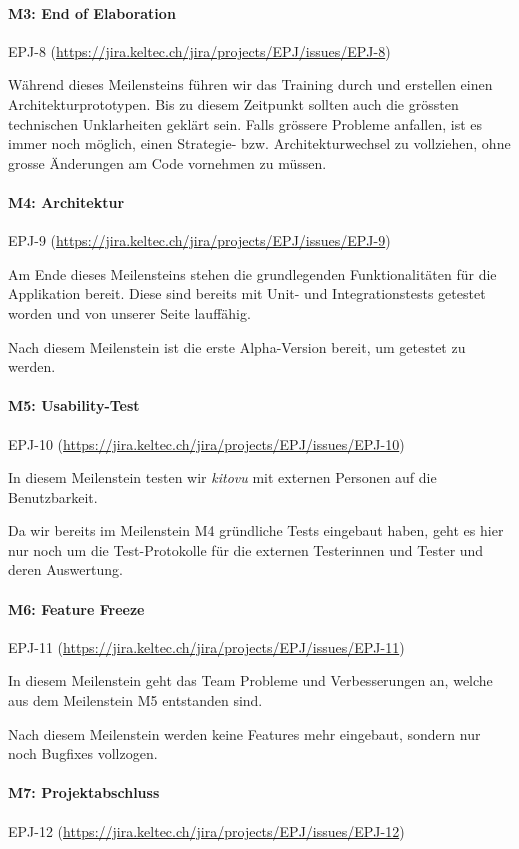 \documentclass[a4paper]{article}
\def\jiraurl{https://jira.keltec.ch/jira}
\newcommand{\fulljiraissue}[1]{EPJ-#1 (\url{\jiraurl/projects/EPJ/issues/EPJ-#1})}
\begin{document}
\paragraph{M3: End of Elaboration} \fulljiraissue{8}

Während dieses Meilensteins führen wir das Training durch und erstellen einen Architekturprototypen. Bis zu diesem Zeitpunkt sollten auch die grössten technischen Unklarheiten geklärt sein. Falls grössere Probleme anfallen, ist es immer noch möglich, einen Strategie- bzw. Architekturwechsel zu vollziehen, ohne grosse Änderungen am Code vornehmen zu müssen.

\paragraph{M4: Architektur} \fulljiraissue{9}

Am Ende dieses Meilensteins stehen die grundlegenden Funktionalitäten für die Applikation bereit. Diese sind bereits mit Unit- und Integrationstests getestet worden und von unserer Seite lauffähig.

Nach diesem Meilenstein ist die erste Alpha-Version bereit, um getestet zu werden.

\paragraph{M5: Usability-Test} \fulljiraissue{10}

In diesem Meilenstein testen wir \emph{kitovu} mit externen Personen auf die Benutzbarkeit.

Da wir bereits im Meilenstein M4 gründliche Tests eingebaut haben, geht es hier nur noch um die Test-Protokolle für die externen Testerinnen und Tester und deren Auswertung.

\paragraph{M6: Feature Freeze} \fulljiraissue{11}

In diesem Meilenstein geht das Team Probleme und Verbesserungen an, welche aus dem Meilenstein M5 entstanden sind.

Nach diesem Meilenstein werden keine Features mehr eingebaut, sondern nur noch Bugfixes vollzogen.

\paragraph{M7: Projektabschluss} \fulljiraissue{12}
\end{document}
